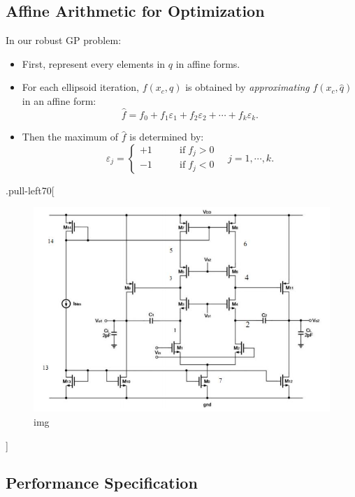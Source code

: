 \documentclass[
]{article}
\providecommand{\tightlist}{%
  \setlength{\itemsep}{0pt}\setlength{\parskip}{0pt}}
\begin{document}
\hypertarget{affine-arithmetic-for-optimization}{%
\subsection{Affine Arithmetic for Optimization}\label{affine-arithmetic-for-optimization}}

In our robust GP problem:

\begin{itemize}
\tightlist
\item
  First, represent every elements in \(q\) in affine forms.
\item
  For each ellipsoid iteration, \(f(x_c,q)\) is obtained by \emph{approximating} \(f(x_c,\hat{q})\) in an affine form:
  \[\hat{f} = f_0 + f_1 \varepsilon_1 + f_2 \varepsilon_2 + \cdots +  f_k \varepsilon_k.\]
\item
  Then the maximum of \(\hat{f}\) is determined by:
  \[\varepsilon_j = \left\{ \begin{array}{ll}
                +1 & \qquad \text{if} \; f_j > 0 \\
                -1 & \qquad \text{if} \; f_j < 0
              \end{array}
    \right.   \quad j=1, \cdots, k.\]
\end{itemize}

.pull-left70{[}

\begin{figure}
\centering
\includegraphics{lec04.files/pic4.png}
\caption{img}
\end{figure}

{]}

\hypertarget{performance-specification}{%
\subsection{Performance Specification}\label{performance-specification}}
\end{document}
